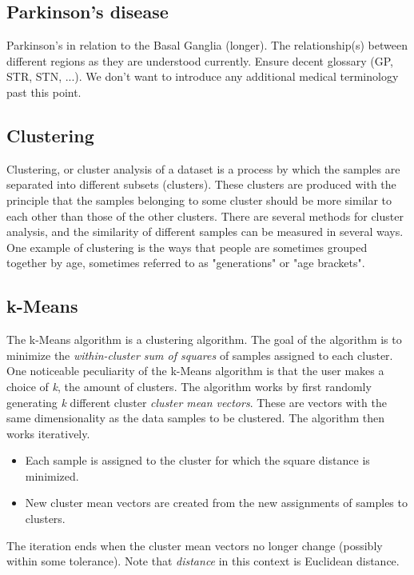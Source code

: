 \documentclass{article}
\begin{document}
\subsection{Parkinson's disease}
Parkinson's in relation to the Basal Ganglia (longer).
The relationship(s) between different regions as they are understood currently.
Ensure decent glossary (GP, STR, STN, ...).
We don't want to introduce any additional medical terminology past this point.

\subsection{Clustering}
Clustering, or cluster analysis of a dataset is a process by which the samples are separated into different subsets (clusters). These clusters are produced with the principle that the samples belonging to some cluster should be more similar to each other than those of the other clusters. There are several methods for cluster analysis, and the similarity of different samples can be measured in several ways. One example of clustering is the ways that people are sometimes grouped together by age, sometimes referred to as "generations" or "age brackets".

\subsection{k-Means}
The k-Means algorithm is a clustering algorithm. The goal of the algorithm is to minimize the \textit{within-cluster sum of squares} of samples assigned to each cluster. One noticeable peculiarity of the k-Means algorithm is that the user makes a choice of \textit{k}, the amount of clusters. The algorithm works by first randomly generating \textit{k} different cluster \textit{cluster mean vectors}. These are vectors with the same dimensionality as the data samples to be clustered. The algorithm then works iteratively. \citep[p258-260]{PractStats}
\begin{itemize}
    \item Each sample is assigned to the cluster for which the square distance is minimized.
    \item New cluster mean vectors are created from the new assignments of samples to clusters.
\end{itemize}
The iteration ends when the cluster mean vectors no longer change (possibly within some tolerance). Note that \textit{distance} in this context is Euclidean distance.
\end{document}
